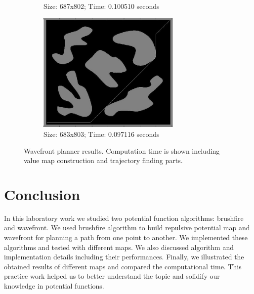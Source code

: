 \documentclass[a4paper]{article}
\begin{document}
\begin{figure}[H]
\begin{subfigure}[t]{3in}
		\caption{Size: 687x802; Time: 0.100510 seconds}\label{fig:wf-c}
	\end{subfigure}
	\quad
	\begin{subfigure}[t]{3in}
		\centering
		\includegraphics[height=2.3in]{wf-obstaclesBig}
		\caption{Size: 683x803; Time: 0.097116 seconds}\label{fig:wf-d}
	\end{subfigure}
\caption{Wavefront planner results. Computation time is shown including value map construction and trajectory finding parts.}
\label{fig:bf-map}
\end{figure}

\section{Conclusion}
In this laboratory work we studied two potential function algorithms: brushfire and wavefront. We used brushfire algorithm to build repulsive potential map and wavefront for planning a path from one point to another. We implemented these algorithms and tested with different maps. We also discussed algorithm and implementation details including their performances. Finally, we illustrated the obtained results of different maps and compared the computational time. This practice work helped us to better understand the topic and solidify our knowledge in potential functions.
\end{document}

